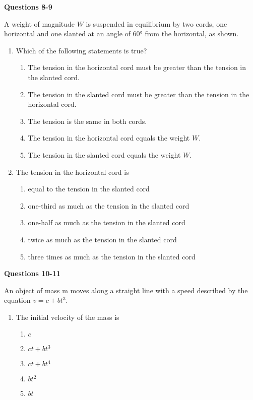 \documentclass{../../oss-apphys}
\begin{document}
\begin{multicols}{2}
  \textbf{Questions 8-9}

  A weight of magnitude $W$ is suspended in equilibrium by two cords, one
  horizontal and one slanted at an angle of \ang{60} from the horizontal, as
  shown.
  \begin{center}
  \end{center}
  \begin{enumerate}[resume,leftmargin=18pt]
  \item Which of the following statements is true?
    \begin{enumerate}[noitemsep,topsep=0pt,leftmargin=18pt,label=(\Alph*)]
    \item The tension in the horizontal cord must be greater than the tension
      in the slanted cord.
    \item The tension in the slanted cord must be greater than the tension in
      the horizontal cord.
    \item The tension is the same in both cords.
    \item The tension in the horizontal cord equals the weight $W$.
    \item The tension in the slanted cord equals the weight $W$.
    \end{enumerate}

  \item The tension in the horizontal cord is
    \begin{enumerate}[noitemsep,topsep=0pt,leftmargin=18pt,label=(\Alph*)]
    \item equal to the tension in the slanted cord
    \item one-third as much as the tension in the slanted cord
    \item one-half as much as the tension in the slanted cord
    \item twice as much as the tension in the slanted cord
    \item three times as much as the tension in the slanted cord
    \end{enumerate}
  \end{enumerate}
  \columnbreak
  
  \textbf{Questions 10-11}

  An object of mass m moves along a straight line with a speed described by the
  equation $v=c+bt^3$.
  \begin{enumerate}[resume,leftmargin=18pt]
  \item The initial velocity of the mass is
    \begin{enumerate}[noitemsep,topsep=0pt,leftmargin=18pt,label=(\Alph*)]
    \item $c$
    \item $ct+bt^3$
    \item $ct+bt^4$
    \item $bt^2$
    \item $bt$
    \end{enumerate}


\end{enumerate}
\end{multicols}
\end{document}

